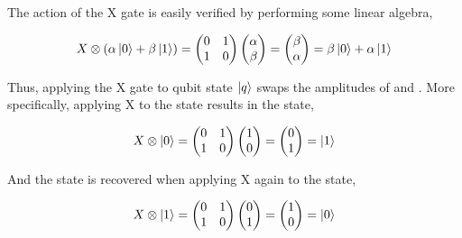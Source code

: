 The action of the X gate is easily verified by performing some linear algebra,

\begin{equation}
\label{equ:xverification1}
X \otimes (\alpha \ket{0} + \beta \ket{1}) = \begin{pmatrix}
 0 & 1 \\ 
 1 & 0
 \end{pmatrix} \begin{pmatrix}
 \alpha  \\ 
 \beta
 \end{pmatrix} = \begin{pmatrix}
 \beta  \\ 
 \alpha
 \end{pmatrix} = \beta \ket{0} + \alpha \ket{1}
\end{equation}

Thus, applying the X gate to qubit state $\ket{q}$ swaps the amplitudes of \0 and \1. More specifically, applying X to the \0 state results in the \1 state,

\begin{equation}
\label{equ:xverification2}
X \otimes \ket{0} = \begin{pmatrix}
 0 & 1 \\ 
 1 & 0
 \end{pmatrix} \begin{pmatrix}
 1  \\ 
 0
 \end{pmatrix} = \begin{pmatrix}
 0  \\ 
 1 \end{pmatrix} =  \ket{1}
\end{equation}

And the \0 state is recovered when applying X again to the \1 state,

\begin{equation}
\label{equ:xverification3}
X \otimes \ket{1} = \begin{pmatrix}
 0 & 1 \\ 
 1 & 0
 \end{pmatrix} \begin{pmatrix}
 0  \\ 
 1
 \end{pmatrix} = \begin{pmatrix}
 1  \\ 
 0 \end{pmatrix} =  \ket{0}
\end{equation}

